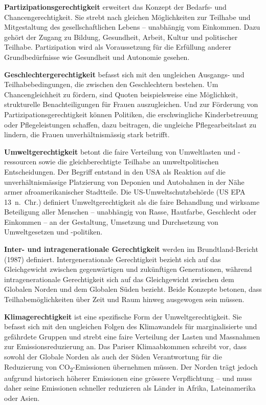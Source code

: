 \documentclass[
  nswissgerman,
  a4paper,
  DIV=11,
  numbers=noendperiod,
  oneside,
  openany]{scrreprt}
\begin{document}
\begin{tcolorbox}
\textbf{Partizipationsgerechtigkeit} erweitert das Konzept der Bedarfs-
und Chancengerechtigkeit. Sie strebt nach gleichen Möglichkeiten zur
Teilhabe und Mitgestaltung des gesellschaftlichen Lebens -- unabhängig
vom Einkommen. Dazu gehört der Zugang zu Bildung, Gesundheit, Arbeit,
Kultur und politischer Teilhabe. Partizipation wird als Voraussetzung
für die Erfüllung anderer Grundbedürfnisse wie Gesundheit und Autonomie
gesehen.

\textbf{Geschlechtergerechtigkeit} befasst sich mit den ungleichen
Ausgangs- und Teilhabebedingungen, die zwischen den Geschlechtern
bestehen. Um Chancengleichheit zu fördern, sind Quoten beispielsweise
eine Möglichkeit, strukturelle Benachteiligungen für Frauen
auszugleichen. Und zur Förderung von Partizipationsgerechtigkeit können
Politiken, die erschwingliche Kinderbetreuung oder Pflegeleistungen
schaffen, dazu beitragen, die ungleiche Pflegearbeitslast zu lindern,
die Frauen unverhältnismässig stark betrifft.

\textbf{Umweltgerechtigkeit} betont die faire Verteilung von
Umweltlasten und -ressourcen sowie die gleichberechtigte Teilhabe an
umweltpolitischen Entscheidungen. Der Begriff entstand in den USA als
Reaktion auf die unverhältnismässige Platzierung von Deponien und
Autobahnen in der Nähe armer afroamerikanischer Stadtteile. Die
US-Umweltschutzbehörde (US EPA 13~n.~Chr.) definiert Umweltgerechtigkeit
als die faire Behandlung und wirksame Beteiligung aller Menschen --
unabhängig von Rasse, Hautfarbe, Geschlecht oder Einkommen -- an der
Gestaltung, Umsetzung und Durchsetzung von Umweltgesetzen und
-politiken.

\textbf{Inter- und intragenerationale Gerechtigkeit} werden im
Brundtland-Bericht (1987) definiert. Intergenerationale Gerechtigkeit
bezieht sich auf das Gleichgewicht zwischen gegenwärtigen und
zukünftigen Generationen, während intragenerationale Gerechtigkeit sich
auf das Gleichgewicht zwischen dem Globalen Norden und dem Globalen
Süden bezieht. Beide Konzepte betonen, dass Teilhabemöglichkeiten über
Zeit und Raum hinweg ausgewogen sein müssen.

\textbf{Klimagerechtigkeit} ist eine spezifische Form der
Umweltgerechtigkeit. Sie befasst sich mit den ungleichen Folgen des
Klimawandels für marginalisierte und gefährdete Gruppen und strebt eine
faire Verteilung der Lasten und Massnahmen zur Emissionsreduzierung an.
Das Pariser Klimaabkommen schreibt vor, dass sowohl der Globale Norden
als auch der Süden Verantwortung für die Reduzierung von
CO\textsubscript{2}-Emissionen übernehmen müssen. Der Norden trägt
jedoch aufgrund historisch höherer Emissionen eine grössere
Verpflichtung -- und muss daher seine Emissionen schneller reduzieren
als Länder in Afrika, Lateinamerika oder Asien.

\end{tcolorbox}
\end{document}
